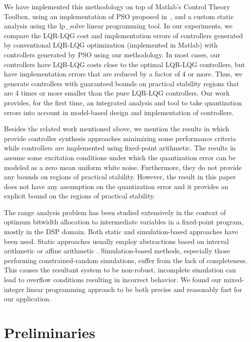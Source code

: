 \documentclass{amsart}
\numberwithin{equation}{section}
\def\myparagraph#1{{\smallskip\noindent{\bf #1}}}
\begin{document}
We have implemented this methodology
on top of Matlab's Control Theory Toolbox, using an implementation of PSO proposed in~\cite{ebbesen}, 
and a custom static analysis using the lp\_solve linear programming
tool. In our experiments, we compare the LQR-LQG cost and implementation errors of
controllers generated by conventional LQR-LQG optimization (implemented in Matlab)
with controllers generated by PSO using our methodology.
In most cases, our controllers have LQR-LQG costs close to the optimal LQR-LQG controllers, but
have implementation errors that are reduced by a factor of 4 or more.
Thus, we generate controllers with guaranteed bounds on practical stability regions that are
4 times or more smaller than the pure LQR-LQG controllers.
Our work provides, for the first time, an integrated analysis and tool to take 
quantization errors into account in model-based design and implementation of controllers.

\myparagraph{Other Related Work}
Besides the related work mentioned above, we mention
the results in \cite{williamson,williamson1,liu1} which provide controller synthesis approaches minimizing some performance 
criteria while controllers are implemented using fixed-point arithmetic. 
The results in \cite{williamson,williamson1,liu1} assume some excitation conditions under which the quantization error 
can be modeled as a zero mean uniform white noise. 
Furthermore, they do not provide any bounds on regions of practical stability. 
However, the result in this paper does not have any assumption on the quantization error 
and it provides an explicit bound on the regions of practical stability.

The range analysis problem has been studied extensively in the context of 
optimum bitwidth allocation to intermediate variables in a fixed-point program, mostly in the DSP domain.
Both static \cite{LGCMLC_TCAD_06, LCN_TCAD_07, OCCLM_FPL_07} 
and simulation-based \cite{BR_RSP_05, MSBZ_TCAD_07} approaches have been used. 
Static approaches usually employ abstractions based on interval arithmetic \cite{Moore66} or affine arithmetic \cite{SF_IMPA_97}. 
Simulation-based methods, especially those performing constrained-random simulations, suffer from the lack of completeness. 
This causes the resultant system to be non-robust, incomplete simulation can lead to overflow 
conditions resulting in incorrect behavior.
We found our mixed-integer linear programming approach to be both precise and reasonably fast for our application.


\section{Preliminaries}\label{preliminaries}
\end{document}
